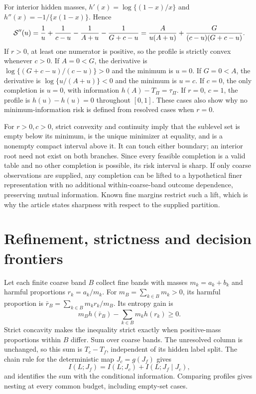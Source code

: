 \documentclass[10pt]{article}
\begin{document}
For interior hidden masses, $h'(x)=\log\{(1-x)/x\}$ and $h''(x)=-1/\{x(1-x)\}$. Hence
\begin{equation}
 \mathcal S''(u)=\frac1u+\frac1{c-u}-\frac1{A+u}-\frac1{G+c-u}
 =\frac{A}{u(A+u)}+\frac{G}{(c-u)(G+c-u)}.
\end{equation}
If $r>0$, at least one numerator is positive, so the profile is strictly convex whenever $c>0$. If $A=0<G$, the derivative is $\log\{(G+c-u)/(c-u)\}>0$ and the minimum is $u=0$. If $G=0<A$, the derivative is $\log\{u/(A+u)\}<0$ and the minimum is $u=c$. If $c=0$, the only completion is $u=0$, with information $h(A)-T_\Pi=\tau_\Pi$. If $r=0$, $c=1$, the profile is $h(u)-h(u)=0$ throughout $[0,1]$. These cases also show why no minimum-information risk is defined from resolved cases when $r=0$.

For $r>0,c>0$, strict convexity and continuity imply that the sublevel set is empty below its minimum, is the unique minimizer at equality, and is a nonempty compact interval above it. It can touch either boundary; an interior root need not exist on both branches. Since every feasible completion is a valid table and no other completion is possible, its risk interval is sharp. If only coarse observations are supplied, any completion can be lifted to a hypothetical finer representation with no additional within-coarse-band outcome dependence, preserving mutual information. Known fine margins restrict such a lift, which is why the article states sharpness with respect to the supplied partition.

\section{Refinement, strictness and decision frontiers}
Let each finite coarse band $B$ collect fine bands with masses $m_k=a_k+b_k$ and harmful proportions $r_k=a_k/m_k$. For $m_B=\sum_{k\in B}m_k>0$, its harmful proportion is $\bar r_B=\sum_{k\in B}m_kr_k/m_B$. Its entropy gain is
\begin{equation}
 m_Bh(\bar r_B)-\sum_{k\in B}m_kh(r_k)\ge0.
\end{equation}
Strict concavity makes the inequality strict exactly when positive-mass proportions within $B$ differ. Sum over coarse bands. The unresolved column is unchanged, so this sum is $T_c-T_f$, independent of its hidden label split. The chain rule for the deterministic map $J_c=g(J_f)$ gives
\begin{equation}
 I(L;J_f)=I(L;J_c)+I(L;J_f\mid J_c),
\end{equation}
and identifies the sum with the conditional information. Comparing profiles gives nesting at every common budget, including empty-set cases.
\end{document}
